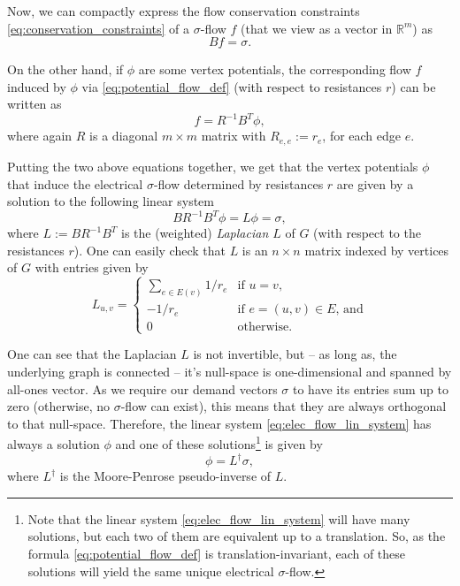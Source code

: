 \documentclass[11pt, letterpaper]{article}
\newcommand{\bbR}{\mathbb{R}}
\newcommand{\pinv}[1]{{#1}^{\dagger}}
\newcommand{\vphi}{\boldsymbol{\mathit{\phi}}}
\newcommand{\vsigma}{\boldsymbol{\mathit{\sigma}}}
\newcommand{\ff}{\boldsymbol{\mathit{f}}}
\newcommand{\rr}{\boldsymbol{\mathit{r}}}
\newcommand{\BB}{\boldsymbol{\mathit{B}}}
\newcommand{\LL}{\boldsymbol{\mathit{L}}}
\newcommand{\RR}{\boldsymbol{\mathit{R}}}
\begin{document}
Now, we can compactly express the flow conservation constraints \eqref{eq:conservation_constraints} of a $\vsigma$-flow $\ff$ (that we view as a vector in $\bbR^m$) as
\[
\BB \ff =\vsigma.
\]

On the other hand, if $\vphi$ are some vertex potentials, the corresponding flow $\ff$ induced by $\vphi$ via \eqref{eq:potential_flow_def} (with respect to resistances $\rr$) can be written as
\[
\ff = \RR^{-1} \BB^T \vphi,
\]
where again $\RR$ is a diagonal $m\times m$ matrix with $R_{e,e}:=r_e$, for each edge $e$. 

Putting the two above equations together, we get that the vertex potentials $\vphi$ that induce the electrical $\vsigma$-flow determined by resistances $\rr$ are given by a  solution to the following linear system
\begin{equation}\label{eq:elec_flow_lin_system}
\BB \RR^{-1} \BB^T \vphi = \LL \vphi= \vsigma,
\end{equation}
where $\LL:=\BB \RR^{-1} \BB^T$ is the (weighted) \emph{Laplacian $\LL$} of $G$ (with respect to the resistances $\rr$). One can easily check that $\LL$ is an $n\times n$ matrix indexed by vertices of $G$ with entries given by 
\begin{equation}
\label{eq:def_of_laplacian}
  L_{u,v} = \begin{cases}
\sum_{e\in E(v)} 1/r_e & \text{if $u=v$,}\\
-1/r_{e}  & \text{if $e=(u,v)\in E$, and}\\
0 & \text{otherwise.}
\end{cases}
\end{equation}


One can see that the Laplacian $\LL$ is not invertible, but -- as long as, the underlying graph is connected -- it's null-space is one-dimensional and spanned by all-ones vector. As we require our demand vectors $\vsigma$ to have its entries sum up to zero (otherwise, no $\vsigma$-flow can exist), this means that they are always orthogonal to that null-space. Therefore, the linear system \eqref{eq:elec_flow_lin_system} has always a solution $\vphi$ and one of these solutions\footnote{Note that the linear system \eqref{eq:elec_flow_lin_system} will have many solutions, but each two of them are equivalent up to a translation. So, as the formula \eqref{eq:potential_flow_def} is translation-invariant, each of these solutions will yield the same unique electrical $\vsigma$-flow.} is given by
\[
\vphi = \pinv{\LL} \vsigma,
\]
where $\pinv{\LL}$ is the Moore-Penrose pseudo-inverse of $\LL$.
\end{document}
